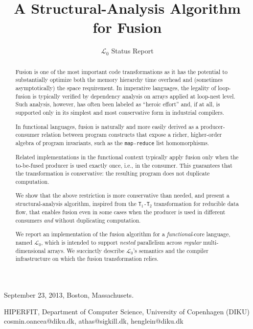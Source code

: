 \documentclass{sigplanconf}  %
\newcommand{\comment}[2]{\textcolor{red}{\scriptsize \textsf \textbf{#1:}{#2}}}
\begin{document}
 {September 23, 2013, Boston, Massachusets.}


\title{A Structural-Analysis Algorithm for Fusion}
\subtitle{$\mathcal{L}_0$ Status Report}


           {HIPERFIT, Department of Computer Science, University of Copenhagen (DIKU)}
           {cosmin.oancea@diku.dk, athas@sigkill.dk, henglein@diku.dk}



\maketitle



\begin{abstract}

Fusion is one of the most important code transformations as it 
has the potential to substantially optimize both the memory hierarchy 
time overhead and (sometimes asymptotically) the space requirement.
%
In imperative languages, the legality of loop-fusion is typically 
verified by dependency analysis on arrays applied at loop-nest level.
Such analysis, however, has often been labeled as ``heroic effort''
and, if at all, is supported only in its simplest and most
conservative form in industrial compilers.  

In functional languages, fusion is naturally and more easily derived
as a producer-consumer relation between program constructs that expose
a richer, higher-order algebra of program invariants, 
such as the {\tt map-reduce} list homomorphisms. %

Related implementations in the functional context typically 
apply fusion only when the to-be-fused producer is used exactly once,
i.e., in the consumer.   This guarantees that the transformation is
conservative: the resulting program does not duplicate computation.

We show that the above restriction is more conservative than needed,
and present a structural-analysis algorithm, inspired
from the {\tt T$_1$-T$_2$} transformation for reducible data flow,
that enables fusion even in some cases when the producer is used 
in different consumers {\em and} without duplicating computation.  

We report an implementation of the fusion algorithm for a 
{\em functional}-core language, named $\mathcal{L}_0$, which is intended 
to support {\em nested} parallelism across {\em regular} 
multi-dimensional arrays.  We succinctly describe $\mathcal{L}_0$'s
semantics and the compiler infrastructure on which the fusion
transformation relies.

\end{abstract}
\end{document}
